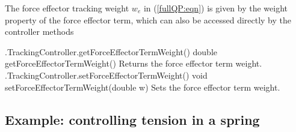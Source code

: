 The force effector tracking weight $w_e$ in (\ref{fullQP:eqn}) is
given by the {\sf weight} property of the force effector term,
which can also be accessed directly by the controller methods
%
\begin{methodtable}{0.6}{0.4}
\midline
%
\methodentry
{\inverse.TrackingController.getForceEffectorTermWeight()}%
{double getForceEffectorTermWeight()}%
{Returns the force effector term weight.}%
%
\methodentry
{\inverse.TrackingController.setForceEffectorTermWeight()}%
{void setForceEffectorTermWeight(double w)}%
{Sets the force effector term weight.}%
%
\midline
\end{methodtable}
%

\subsection{Example: controlling tension in a spring}

